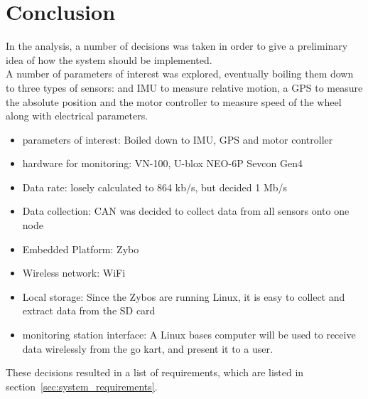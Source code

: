





\section{Conclusion}
\label{sec:analysisconclusion}
In the analysis, a number of decisions was taken in order to give a preliminary idea of how the system should be implemented. \\

A number of parameters of interest was explored, eventually boiling them down to three types of sensors: and IMU to measure relative motion, a GPS to measure the absolute position and the motor controller to measure speed of the wheel along with electrical parameters.

\begin{itemize}
	\item parameters of interest: Boiled down to IMU, GPS and motor controller
	\item hardware for monitoring: VN-100, U-blox NEO-6P Sevcon Gen4
	\item Data rate: losely calculated to 864 kb/s, but decided 1 Mb/s
	\item Data collection: CAN was decided to collect data from all sensors onto one node
	\item Embedded Platform: Zybo
	\item Wireless network: WiFi
	\item Local storage: Since the Zybos are running Linux, it is easy to collect and extract data from the SD card 
	\item monitoring station interface: A Linux bases computer will be used to receive data wirelessly from the go kart, and present it to a user.  
\end{itemize}

These decisions resulted in a list of requirements, which are listed in section~\ref{sec:system_requirements}.

